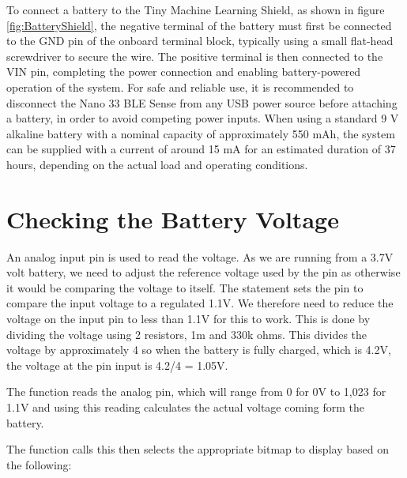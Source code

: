 To connect a battery to the Tiny Machine Learning Shield, as shown in figure \ref{fig:BatteryShield}, the negative terminal of the battery must first be connected to the GND pin of the onboard terminal block, typically using a small flat-head screwdriver to secure the wire. The positive terminal is then connected to the VIN pin, completing the power connection and enabling battery-powered operation of the system. For safe and reliable use, it is recommended to disconnect the Nano 33 BLE Sense from any USB power source before attaching a battery, in order to avoid competing power inputs. When using a standard 9 V alkaline battery with a nominal capacity of approximately 550 mAh, the system can be supplied with a current of around 15 mA for an estimated duration of 37 hours, depending on the actual load and operating conditions.










\section{Checking the Battery Voltage}

An analog input pin is used to read the voltage. As we are running from a 3.7V volt battery, we need to adjust the reference voltage used by the pin as otherwise it would be comparing the voltage to itself. The statement  sets the pin to compare the input voltage to a regulated 1.1V. We therefore need to reduce the voltage on the input pin to less than 1.1V for this to work. This is done by dividing the voltage using 2 resistors, 1m and 330k ohms. This divides the voltage by approximately 4 so when the battery is fully charged, which is 4.2V, the voltage at the pin input is 4.2/4 = 1.05V. 




\begin{center}
	
	\label{lst:Battery}
\end{center}


The function  reads the analog pin, which will range from 0 for 0V to 1,023 for 1.1V and using this reading calculates the actual voltage coming form the battery. 

The function  calls this then selects the appropriate bitmap to display based on the following: 

